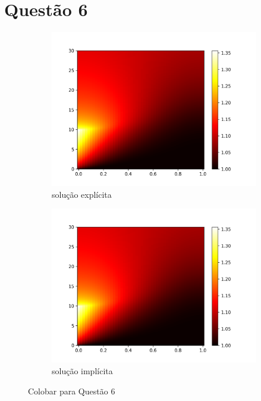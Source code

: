 \documentclass{article}
\begin{document}
\section{Questão 6}
\begin{figure}
\centering
     \begin{subfigure}[b]{0.49\textwidth}
         \centering
         \includegraphics[width=\textwidth]{figs/q6a_colormap.png}
         \caption{ solução explícita}
	\label{fig:q6a_colobar}
     \end{subfigure}
     \hfill
     \begin{subfigure}[b]{0.49\textwidth}
         \centering
         \includegraphics[width=\textwidth]{figs/q6b_colormap.png}
         \caption{solução implícita}
	\label{fig:q6b_colobar}
     \end{subfigure}
\caption{Colobar para Questão 6}
\end{figure}
\end{document}
